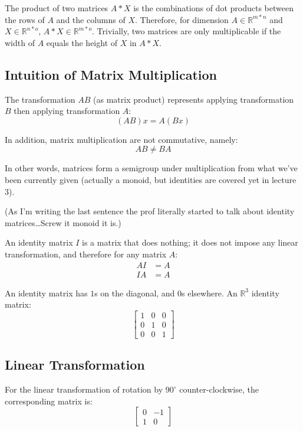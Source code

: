 \documentclass[12pt]{article}
\newcommand{\RR}{\mathbb{R}}
\theoremstyle{definition}
\begin{document}
	The product of two matrices $A * X$ is the combinations of dot products between the rows of $A$ and the columns of $X$. Therefore, for dimension $A \in \RR^{m*n}$ and $X \in \RR^{n*o}$, $A*X \in \RR^{m*o}$. Trivially, two matrices are only multiplicable if the width of $A$ equals the height of $X$ in $A*X$.
	
	\subsection{Intuition of Matrix Multiplication}
	
	The transformation $AB$ (as matrix product) represents applying transformation $B$ then applying transformation $A$:
	$$(AB)x = A(Bx)$$
	
	In addition, matrix multiplication are not commutative, namely:
	$$AB \neq BA$$
	
	In other words, matrices form a semigroup under multiplication from what we've been currently given (actually a monoid, but identities are covered yet in lecture 3).
	
	(As I'm writing the last sentence the prof literally started to talk about identity matrices\dots Screw it monoid it is.)
	
	An identity matrix $I$ is a matrix that does nothing; it does not impose any linear transformation, and therefore for any matrix $A$:
	\begin{align*}
		AI &= A \\
		IA &= A
	\end{align*}
	
	An identity matrix has $1$s on the diagonal, and $0$s elsewhere. An $\RR^3$ identity matrix:
	\begin{equation*}
		\begin{bmatrix}
			1 & 0 & 0 \\ 0 & 1 & 0 \\ 0 & 0 & 1
		\end{bmatrix}
	\end{equation*}
	
	\subsection{Linear Transformation}
	
	For the linear transformation of rotation by $90^\circ$ counter-clockwise, the corresponding matrix is:
	\begin{equation*}
		\begin{bmatrix}
			0 & -1 \\ 1 & 0
		\end{bmatrix}
	\end{equation*}
	
\end{document}
